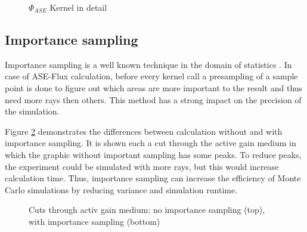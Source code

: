 \begin{figure}[H]
  \centerline
  {}
  \caption{$\Phi_{ASE}$ Kernel in detail}
  \label{graphic:kernel}
\end{figure}

\subsection{Importance sampling}
\label{subsec:importance_sampling}
Importance sampling is a well known technique in the domain
of statistics \cite{importanceSamplingSource}. In case of 
ASE-Flux calculation, before every kernel call a presampling 
of a sample point is done to figure out which areas are more
important to the result and thus need more rays then others.
This method has a strong impact on the precision of the simulation.

Figure \ref{graphic:importance} demonstrates
the differences between calculation without and with
importance sampling. It is shown each a cut through the active
gain medium in which the graphic without important
sampling has some peaks. To reduce peaks, the experiment
could be simulated with more rays, but this would increase
calculation time. Thus, importance sampling can increase the
efficiency of Monte Carlo simulations by reducing variance 
and simulation runtime. 
\begin{figure}%
  \centerline
  {}
  \caption{Cuts through activ gain medium: no importance sampling (top), with importance sampling (bottom)}
  \label{graphic:importance}
\end{figure}

